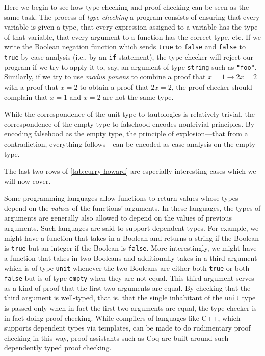 Here we begin to see how type checking and proof checking can be seen as the same task.
The process of \emph{type checking} a program consists of ensuring that every variable is given a type, that every expression assigned to a variable has the type of that variable, that every argument to a function has the correct type, etc.
If we write the Boolean negation function which sends \texttt{true} to \texttt{false} and \texttt{false} to \texttt{true} by case analysis (i.e., by an \texttt{if} statement), the type checker will reject our program if we try to apply it to, say, an argument of type \texttt{string} such as \verb|"foo"|.
Similarly, if we try to use \emph{modus ponens} to combine a proof that $x = 1 \to 2x = 2$ with a proof that $x = 2$ to obtain a proof that $2x = 2$, the proof checker should complain that $x = 1$ and $x = 2$ are not the same type.

While the correspondence of the unit type to tautologies is relatively trivial, the correspondence of the empty type to falsehood encodes nontrivial principles.
By encoding falsehood as the empty type, the principle of explosion---that from a contradiction, everything follows---can be encoded as case analysis on the empty type.

The last two rows of \autoref{tab:curry-howard} are especially interesting cases which we will now cover.

Some programming languages allow functions to return values whose types depend on the \emph{value}s of the functions' arguments.
In these languages, the types of arguments are generally also allowed to depend on the values of previous arguments.
Such languages are said to support dependent types.
For example, we might have a function that takes in a Boolean and returns a string if the Boolean is \texttt{true} but an integer if the Boolean is \texttt{false}.
More interestingly, we might have a function that takes in two Booleans and additionally takes in a third argument which is of type \texttt{unit} whenever the two Booleans are either both \texttt{true} or both \texttt{false} but is of type \texttt{empty} when they are not equal.
This third argument serves as a kind of proof that the first two arguments are equal.
By checking that the third argument is well-typed, that is, that the single inhabitant of the \texttt{unit} type is passed only when in fact the first two arguments are equal, the type checker is in fact doing proof checking.
While compilers of languages like C++, which supports dependent types via templates, can be made to do rudimentary proof checking in this way, proof assistants such as Coq are built around such dependently typed proof checking.

